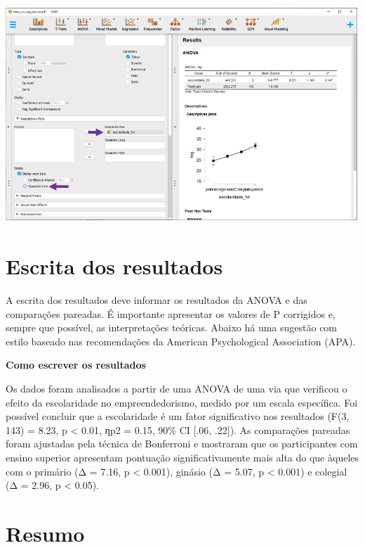 \documentclass[
]{book}
\begin{document}
\includegraphics{./img/cap_anova_posthoc_plots2.png}

\hypertarget{escrita-dos-resultados-4}{%
\section{Escrita dos resultados}\label{escrita-dos-resultados-4}}

A escrita dos resultados deve informar os resultados da ANOVA e das
comparações pareadas. É importante apresentar os valores de P corrigidos
e, sempre que possível, as interpretações teóricas. Abaixo há uma
sugestão com estilo baseado nas recomendações da American Psychological
Association (APA).

\begin{writing}
\textbf{Como escrever os resultados}

Os dados foram analisados a partir de uma ANOVA de uma via que verificou
o efeito da escolaridade no empreendedorismo, medido por um escala
específica. Foi possível concluir que a escolaridade é um fator
significativo nos resultados (F(3, 143) = 8.23, p \textless{} 0.01, ηp2
= 0.15, 90\% CI {[}.06, .22{]}). As comparações pareadas foram ajustadas
pela técnica de Bonferroni e mostraram que os participantes com ensino
superior apresentam pontuação significativamente mais alta do que
àqueles com o primário (Δ = 7.16, p \textless{} 0.001), ginásio (Δ =
5.07, p \textless{} 0.001) e colegial (Δ = 2.96, p \textless{} 0.05).
\end{writing}

\hypertarget{resumo-6}{%
\section{Resumo}\label{resumo-6}}
\end{document}
